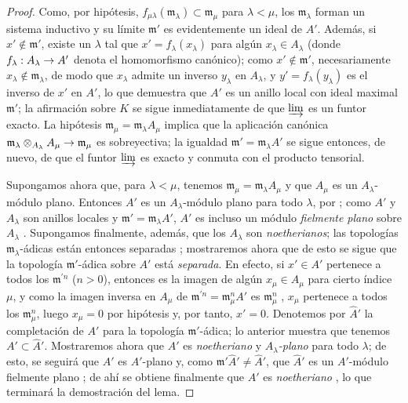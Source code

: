 \documentclass[oneside]{amsart}
\makeatletter
\newcommand{\ega@arrow}[2]{\mathchoice{#1}{#2}{#2}{#2}}
\renewcommand{\to}{\ega@arrow{\longrightarrow}{\rightarrow}}
\newcommand{\oldpage}[2][]{{\marginnote{\normalfont\textbf{#1}~|~#2}}\ignorespaces}
\makeatother
\begin{document}
\begin{proof}
Como, por hipótesis, $f_{\mu\lambda}(\mathfrak{m}_\lambda)\subset\mathfrak{m}_\mu$ para $\lambda<\mu$, los $\mathfrak{m}_\lambda$ forman un sistema inductivo y su límite $\mathfrak{m}'$ es evidentemente un ideal de $A'$.
Además, si $x'\not\in\mathfrak{m}'$, existe un $\lambda$ tal que $x'=f_\lambda(x_\lambda)$ para algún $x_\lambda\in A_\lambda$ (donde $f_\lambda:A_\lambda\to A'$ denota el homomorfismo canónico);
como $x'\not\in\mathfrak{m}'$, necesariamente $x_\lambda\not\in\mathfrak{m}_\lambda$, de modo que $x_\lambda$ admite un inverso $y_\lambda$ en $A_\lambda$, y $y'=f_\lambda(y_\lambda)$ es el inverso de $x'$ en $A'$, lo que demuestra que $A'$ es un anillo local con ideal maximal $\mathfrak{m}'$;
la afirmación sobre $K$ se sigue inmediatamente de que $\varinjlim$ es un funtor exacto.
La hipótesis $\mathfrak{m}_\mu=\mathfrak{m}_\lambda A_\mu$ implica que la aplicación canónica $\mathfrak{m}_\lambda\otimes_{A_\lambda}A_\mu\to\mathfrak{m}_\mu$ es sobreyectiva;
la igualdad $\mathfrak{m}'=\mathfrak{m}_\lambda A'$ se sigue entonces, de nuevo, de que el funtor $\varinjlim$ es exacto y conmuta con el producto tensorial.

Supongamos ahora que, para $\lambda<\mu$, tenemos $\mathfrak{m}_\mu=\mathfrak{m}_\lambda A_\mu$ y que $A_\mu$ es un $A_\lambda$-módulo plano.
Entonces $A'$ es un $A_\lambda$-módulo plano para todo $\lambda$, por ;
como $A'$ y $A_\lambda$ son anillos locales y $\mathfrak{m}'=\mathfrak{m}_\lambda A'$, $A'$ es incluso un módulo \emph{fielmente plano} sobre $A_\lambda$ .
Supongamos finalmente, además, que los $A_\lambda$ son \emph{noetherianos};
las topologías $\mathfrak{m}_\lambda$-ádicas están entonces separadas ;
mostraremos ahora que de esto se sigue que la topología $\mathfrak{m}'$-ádica sobre $A'$ está \emph{separada}.
En efecto, si $x'\in A'$ pertenece a todos los $\mathfrak{m}^{'n}$ ($n>0$), entonces es la imagen de algún $x_\mu\in A_\mu$ para cierto índice $\mu$, y como la imagen inversa en $A_\mu$ de $\mathfrak{m}^{'n}=\mathfrak{m}_\mu^n A'$ es $\mathfrak{m}_\mu^n$ , $x_\mu$ pertenece a todos los $\mathfrak{m}_\mu^n$, luego $x_\mu=0$ por hipótesis y, por tanto, $x'=0$.
Denotemos por $\widehat{A}'$ la completación de $A'$ para la topología $\mathfrak{m}'$-ádica;
lo anterior muestra que tenemos $A'\subset\widehat{A}'$.
Mostraremos ahora que $\widehat{A}'$ es \emph{noetheriano} y \emph{$A_\lambda$-plano} para todo $\lambda$;
de esto,
\oldpage[0\textsubscript{III-1}]{22}
se seguirá que $\widehat{A}'$ es $A'$-plano  y, como $\mathfrak{m}'\widehat{A}'\neq\widehat{A}'$, que $\widehat{A}'$ es un $A'$-módulo fielmente plano ; de ahí se obtiene finalmente que $A'$ es \emph{noetheriano} , lo que terminará la demostración del lema.


\end{proof}
\end{document}

